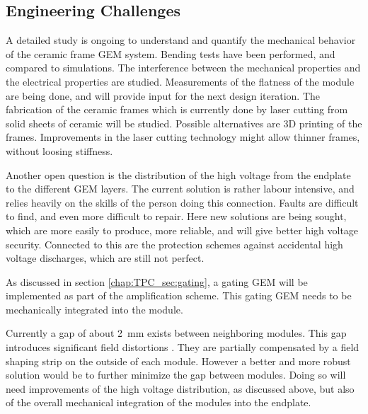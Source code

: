 \subsection{Engineering Challenges}
A detailed study is ongoing to understand and quantify the mechanical behavior of the ceramic frame GEM system. Bending tests have been performed, and compared to simulations. The interference between the mechanical properties and the electrical properties are studied. Measurements of the flatness of the module are being done, and will provide input for the next design iteration.
The fabrication of the ceramic frames which is currently done by laser cutting from solid sheets of ceramic will be studied. Possible alternatives are 3D printing of the frames. Improvements in the laser cutting technology might allow thinner frames, without loosing stiffness.

Another open question is the distribution of the high voltage from the endplate to the different GEM layers. The current solution is rather labour intensive, and relies heavily on the skills of the person doing this connection. Faults are difficult to find, and even more difficult to repair. Here new solutions are being sought, which are more easily to produce, more reliable, and will give better high voltage security. Connected to this are the protection schemes against accidental high voltage discharges, which are still not perfect.

As discussed in section \ref{chap:TPC_sec:gating}, a gating GEM will be implemented as part of the amplification scheme. This gating GEM needs to be mechanically integrated into the module.

Currently a gap of about \SI{2}{mm} exists between neighboring modules. This gap introduces significant field distortions \cite{Zenker:2014qra}. They are partially compensated by a field shaping strip on the outside of each module. However a better and more robust solution would be to further minimize the gap between modules. Doing so will need improvements of the high voltage distribution, as discussed above, but also of the overall mechanical integration of the modules into the endplate.

